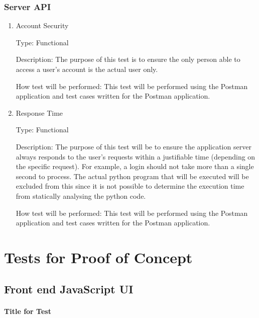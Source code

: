 \documentclass[12pt, titlepage]{article}
\begin{document}
\subsubsection{Server API}

\begin{enumerate}

\item{Account Security\\}

Type: Functional

Description: The purpose of this test is to ensure the only person able to
access a user's account is the actual user only.

How test will be performed: This test will be performed using the Postman
application and test cases written for the Postman application.
					
\item{Response Time\\}

Type: Functional

Description: The purpose of this test will be to ensure the application server
always responds to the user's requests within a justifiable time (depending on
the specific request).  For example, a login should not take more than a single
second to process. The actual python program that will be executed will be
excluded from this since it is not possible to determine the execution time
from statically analysing the python code.

How test will be performed: This test will be performed using the Postman
application and test cases written for the Postman application.

\end{enumerate}

\section{Tests for Proof of Concept}

\subsection{Front end JavaScript UI}
		
\paragraph{Title for Test}
\end{document}
